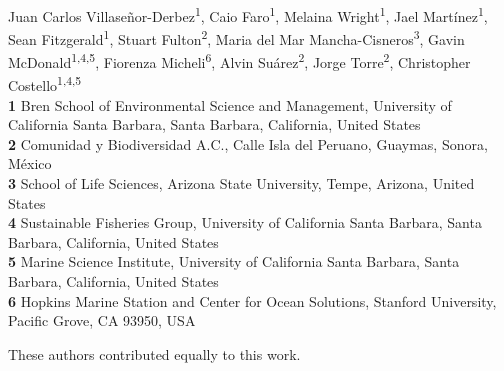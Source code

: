 \documentclass[10pt,letterpaper]{article}
\date{}
\begin{document}
\vspace*{0.2in}

\begin{flushleft}
{\Large
\textbf{} %
}
\newline
\\
Juan Carlos Villaseñor-Derbez\textsuperscript{1\Yinyang*},
Caio Faro\textsuperscript{1\Yinyang},
Melaina Wright\textsuperscript{1\Yinyang},
Jael Martínez\textsuperscript{1\Yinyang},
Sean Fitzgerald\textsuperscript{1\ddag},
Stuart Fulton\textsuperscript{2\ddag},
Maria del Mar Mancha-Cisneros\textsuperscript{3\ddag},
Gavin McDonald\textsuperscript{1,4,5\ddag},
Fiorenza Micheli\textsuperscript{6\ddag},
Alvin Suárez\textsuperscript{2\ddag},
Jorge Torre\textsuperscript{2\ddag},
Christopher Costello\textsuperscript{1,4,5\Yinyang}
\\
\bigskip
\textbf{1} Bren School of Environmental Science and Management, University of California Santa Barbara, Santa Barbara, California, United States
\\
\textbf{2} Comunidad y Biodiversidad A.C., Calle Isla del Peruano, Guaymas, Sonora, México
\\
\textbf{3} School of Life Sciences, Arizona State University, Tempe, Arizona, United States
\\
\textbf{4} Sustainable Fisheries Group, University of California Santa Barbara, Santa Barbara, California, United States
\\
\textbf{5} Marine Science Institute, University of California
Santa Barbara, Santa Barbara, California, United States
\\
\textbf{6} Hopkins Marine Station and Center for Ocean
Solutions, Stanford University, Pacific Grove, CA 93950, USA
\\
\bigskip

% 
%
\Yinyang These authors contributed equally to this work.


\end{flushleft}
\end{document}
